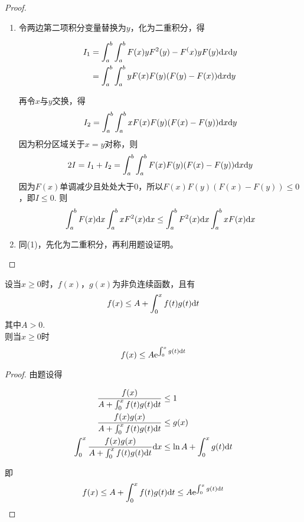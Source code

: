 \begin{proof}
    
    \begin{enumerate}

        \item
            令两边第二项积分变量替换为$y$，化为二重积分，得
        
            \begin{align*}
                I_1 & = \int_{a}^{b}{\int_{a}^{b}{F(x)yF^2(y) - F^(x)yF(y)}\mathrm{d} x}\mathrm{d} y \\
                & = \int_{a}^{b}{\int_{a}^{b}{yF(x)F(y)(F(y) - F(x))}\mathrm{d} x}\mathrm{d} y
            \end{align*}

            再令$x$与$y$交换，得
            $$I_2 = \int_{a}^{b}{\int_{a}^{b}{xF(x)F(y)(F(x) - F(y))}\mathrm{d} x}\mathrm{d} y$$
            因为积分区域关于$x = y$对称，则
            $$2I = I_1 + I_2 = \int_{a}^{b}{\int_{a}^{b}{F(x)F(y)(F(x) - F(y))}\mathrm{d} x}\mathrm{d} y$$
            因为$F(x)$单调减少且处处大于$0$，所以$F(x)F(y)(F(x) - F(y)) \leq 0$，即$I \leq 0$.
            则
            $$ \int_{a}^{b}{F(x)}\mathrm{d} x\int_{a}^{b}{xF^2(x)}\mathrm{d} x \leq \int_{a}^{b}{F^2(x)}\mathrm{d} x \int_{a}^{b}{xF(x)}\mathrm{d} x $$

        \item 同\textup{(1)}，先化为二重积分，再利用题设证明。
        
    \end{enumerate}

\end{proof}

\begin{theorem}

    设当$x \geq 0$时，$f(x)$，$g(x)$为非负连续函数，且有
    $$f(x) \leq A + \int_{0}^{x}{f(t)g(t)}\mathrm{d} t$$
    其中$A > 0$. \\
    则当$x \geq 0$时
    $$ f(x) \leq A \mathrm{e}^{\int_{0}^{x}{g(t)}\mathrm{d} t} $$

\end{theorem}

\begin{proof}

    由题设得

    \begin{align*}
        \dfrac{f(x)}{A + \int_{0}^{x}{f(t)g(t)}\mathrm{d} t} & \leq 1 \\
        \dfrac{f(x)g(x)}{A + \int_{0}^{x}{f(t)g(t)}\mathrm{d} t} & \leq g(x) \\
        \int_{0}^{x}{\dfrac{f(x)g(x)}{A + \int_{0}^{x}{f(t)g(t)}\mathrm{d} t}}\mathrm{d} x & \leq \ln A + \int_{0}^{x}{g(t)}\mathrm{d} t
    \end{align*}

    即
    $$f(x) \leq A+\int_{0}^{x}{f(t)g(t)}\mathrm{d} t \leq A \mathrm{e}^{\int_{0}^{x}{g(t)}\mathrm{d} t} $$

\end{proof}

